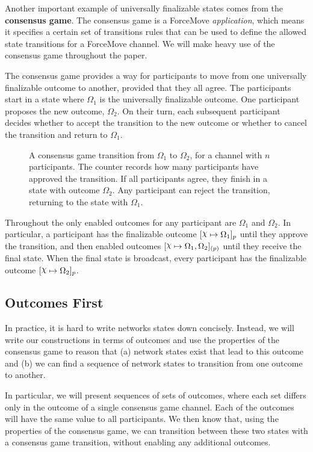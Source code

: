 Another important example of universally finalizable states comes from the \textbf{consensus game}.
The consensus game is a ForceMove \textit{application}, which means it specifies a certain
set of transitions rules that can be used to define the allowed state transitions for a ForceMove channel.
We will make heavy use of the consensus game throughout the paper.

The consensus game provides a way for participants to move from one universally finalizable outcome to another, provided that they all agree.
The participants start in a state where $\Omega_1$ is the universally finalizable outcome.
One participant proposes the new outcome, $\Omega_2$.
On their turn, each subsequent participant decides whether to accept the transition to the new outcome or whether to cancel the transition and return to $\Omega_1$.
\begin{figure}[h]\centering
  \makebox[\textwidth][c]{}
  \caption{
    A consensus game transition from $\Omega_1$ to $\Omega_2$, for a channel with $n$ participants.
    The counter records how many participants have approved the transition.
    If all participants agree, they finish in a state with outcome $\Omega_2$.
    Any participant can reject the transition, returning to the state with $\Omega_1$.
  }
\end{figure}

Throughout the only enabled outcomes for any participant are $\Omega_1$ and $\Omega_2$.
In particular, a participant has the finalizable outcome $\finalizable{\rchi}{\Omega_1}{p}$ until they approve the transition, and then enabled outcomes $\finalizable{\rchi}{\Omega_1, \Omega_2}{(p)}$ until they receive the final state.
When the final state is broadcast, every participant has the finalizable outcome $\finalizable{\rchi}{\Omega_2}{p}$.

\subsection{Outcomes First}

In practice, it is hard to write networks states down concisely.
Instead, we will write our constructions in terms of outcomes and use the properties of the consensus game to reason that (a) network states exist that lead to this outcome and (b) we can find a sequence of network states to transition from one outcome to another.

In particular, we will present sequences of sets of outcomes, where each set differs only in the outcome of a single consensus game channel.
Each of the outcomes will have the same value to all participants.
We then know that, using the properties of the consensus game, we can transition between these two states with a consensus game transition, without enabling any additional outcomes.

